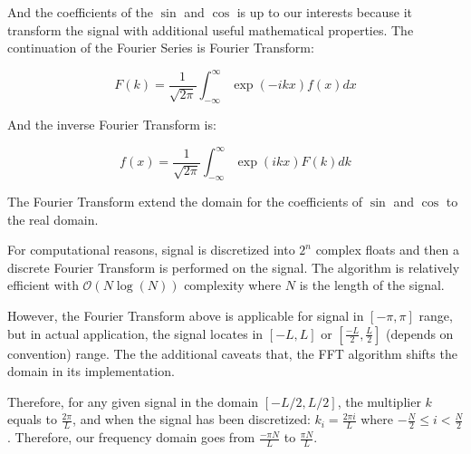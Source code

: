 \documentclass{article}
\begin{document}
    \par
    And the coefficients of the $\sin$ and $\cos$ is up to our interests because it transform the signal with additional useful mathematical properties. 
    The continuation of the Fourier Series is Fourier Transform: 
    
    \begin{equation}\label{eqn:fourier-transform}
        F(k) = \frac{1}{\sqrt{2\pi}}\int_{-\infty}^\infty
        \exp(-ikx)f(x) dx
    \end{equation}
    
    And the inverse Fourier Transform is: 
    
    \begin{equation}
        f(x) = \frac{1}{\sqrt{2\pi}}
        \int_{-\infty}^\infty \exp(ikx) F(k)dk
    \end{equation}
    \par
    The Fourier Transform extend the domain for the coefficients of $\sin$ and $\cos$ to the real domain. 
    
    \par
    For computational reasons, signal is discretized into $2^n$ complex floats and then a discrete Fourier Transform is performed on the signal. The algorithm is relatively efficient with $\mathcal{O}(N\log(N))$ complexity where $N$ is the length of the signal. 
    
    \par
    However, the Fourier Transform above is applicable for signal in $[-\pi, \pi]$ range, but in actual application, the signal locates in $[-L, L]$ or $[\frac{-L}{2}, \frac{L}{2}]$ (depends on convention) range. The the additional caveats that, the FFT algorithm shifts the domain in its implementation. 
    
    \par
    Therefore, for any given signal in the domain $[-L/2, L/2]$, the multiplier $k$ equals to $\frac{2\pi}{L}$, and when the signal has been discretized: $k_i = \frac{2\pi i}{L}$ where $-\frac{N}{2}\le i< \frac{N}{2}$. Therefore, our frequency domain goes from $\frac{-\pi N}{L}$ to $\frac{\pi N}{L}$. 
\end{document}

